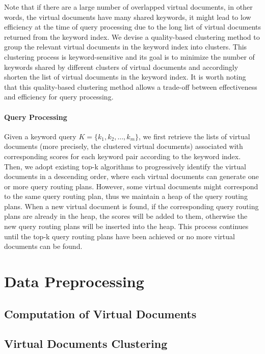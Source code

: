 Note that if there are a large number of overlapped virtual documents, in other words, the virtual
documents have many shared keywords, it might lead to low efficiency at the time of query processing
due to the long list of virtual documents returned from the keyword index. We devise a quality-based
clustering method to group the relevant virtual documents in the keyword index into clusters. This
clustering process is keyword-sensitive and its goal is to minimize the number of keywords shared by
different clusters of virtual documents and accordingly shorten the list of virtual documents in the
keyword index. It is worth noting that this quality-based clustering method allows a trade-off
between effectiveness and efficiency for query processing.

\paragraph{Query Processing}
Given a keyword query $K = \{k_1,k_2,\ldots,k_m\}$, we first retrieve the lists of virtual documents
(more precisely, the clustered virtual documents) associated with corresponding scores for each
keyword pair according to the keyword index. Then, we adopt existing top-k algorithms to
progressively identify the virtual documents in a descending order, where each virtual documents can
generate one or more query routing plans. However, some virtual documents might correspond to the
same query routing plan, thus we maintain a heap of the query routing plans. When a new virtual
document is found, if the corresponding query routing plans are already in the heap, the scores will
be added to them, otherwise the new query routing plans will be inserted into the heap. This process
continues until the top-k query routing plans have been achieved or no more virtual documents can be
found.

\section{Data Preprocessing}\label{qr:preprocessing}


\subsection{Computation of Virtual Documents}\label{qr:vdcompute}


\subsection{Virtual Documents Clustering}\label{qr:vdcluster}

